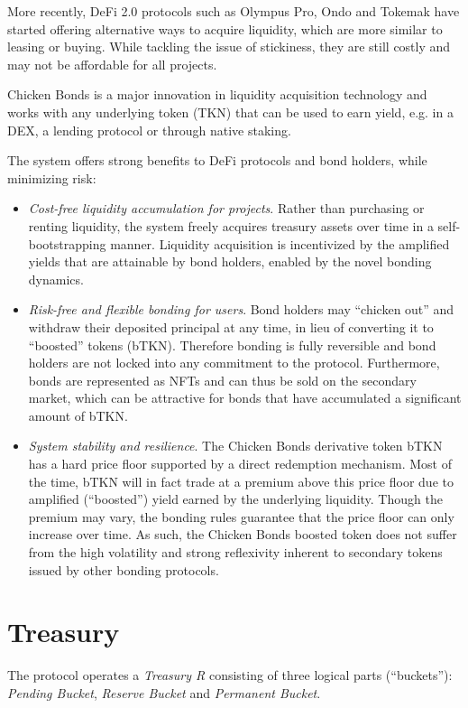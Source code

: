 \documentclass{article}
\begin{document}
More recently, DeFi 2.0 protocols such as Olympus Pro, Ondo and Tokemak have started offering alternative ways to acquire liquidity, which are more similar to leasing or buying. While tackling the issue of stickiness, they are still costly and may not be affordable for all projects.

Chicken Bonds is a major innovation in liquidity acquisition technology and works with any underlying token (TKN) that can be used to earn yield, e.g. in a DEX, a lending protocol or through native staking.

The system offers strong benefits to DeFi protocols and bond holders, while minimizing risk:

\begin{itemize}
    \item \textit{Cost-free liquidity accumulation for projects}. Rather than purchasing or renting liquidity, the system freely acquires treasury assets over time in a self-bootstrapping manner. Liquidity acquisition is incentivized by the amplified yields that are attainable by bond holders, enabled by the novel bonding dynamics.
    \item \textit{Risk-free and flexible bonding for users}. Bond holders may “chicken out” and withdraw their deposited principal at any time, in lieu of converting it to “boosted” tokens (bTKN). Therefore bonding is fully reversible and bond holders are not locked into any commitment to the protocol. Furthermore, bonds are represented as NFTs and can thus be sold on the secondary market, which can be attractive for bonds that have accumulated a significant amount of bTKN.
    \item \textit{System stability and resilience}. The Chicken Bonds derivative token bTKN has a hard price floor supported by a direct redemption mechanism. Most of the time, bTKN will in fact trade at a premium above this price floor due to amplified (“boosted”) yield earned by the underlying liquidity. Though the premium may vary, the bonding rules guarantee that the price floor can only increase over time. As such, the Chicken Bonds boosted token does not suffer from the high volatility and strong reflexivity inherent to secondary tokens issued by other bonding protocols.
\end{itemize}

\section{Treasury}
The protocol operates a \textit{Treasury R} consisting of three logical parts (“buckets”):  \textit{Pending Bucket}, \textit{Reserve Bucket} and \textit{Permanent Bucket}.
\end{document}
